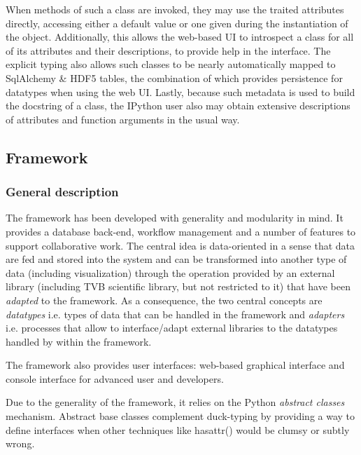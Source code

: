 
 When methods of such a class are invoked,
they may use the traited attributes directly, accessing either a default value
or one given during the instantiation of the object. Additionally, this allows
the web-based UI to introspect a class for all of its attributes and their
descriptions, to provide help in the interface. The explicit typing also allows
such classes to be nearly automatically mapped to SqlAlchemy \& HDF5 tables,
the combination of which provides persistence for datatypes when using the web
UI.  Lastly, because such metadata is used to build the docstring of a class,
the IPython user also may obtain extensive descriptions of attributes and
function arguments in the usual way. 



\subsection{\TVB Framework}

	\subsubsection{General description}

The framework has been developed with generality and modularity in mind. It
provides a database back-end, workflow management and a number of features to
support collaborative work.  The central idea is data-oriented in a sense that
data are fed and stored into the system and can be transformed into another type
of data (including visualization) through the operation provided by an external
library (including TVB scientific library, but not restricted to it) that have
been \emph{adapted} to the framework. As a consequence, the two central concepts
are \emph{datatypes} i.e. types of data that can be handled in the framework and
\emph{adapters} i.e. processes that allow to interface/adapt external libraries
to  the datatypes handled by within the framework.

The framework also provides user interfaces: web-based graphical interface and
console interface for advanced user and developers.

Due to the generality of the framework, it relies on the Python \emph{abstract classes} mechanism.
Abstract base classes complement duck-typing by providing a way to define
interfaces when other techniques like hasattr() would be clumsy or subtly wrong.

